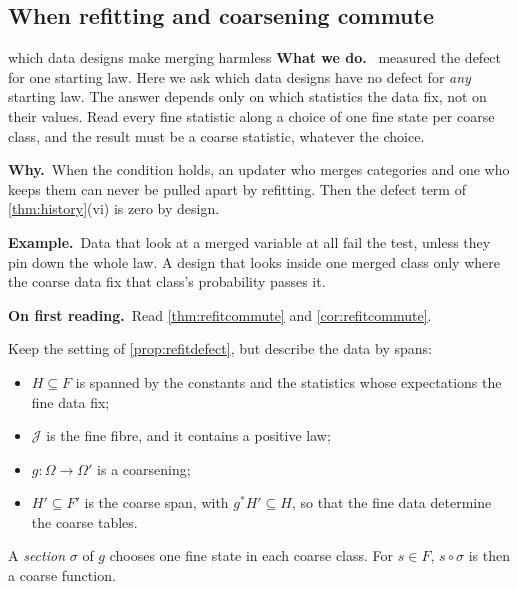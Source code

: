 \documentclass[11pt]{article}
\theoremstyle{definition}\newtheorem{definition}[theorem]{Definition}\newtheorem{remark}[theorem]{Remark}\newtheorem{example}[theorem]{Example}\newtheorem{problem}[theorem]{Open problem}\crefname{problem}{Problem}{Problems}
\newcommand{\rbwhat}{\textcolor{rbWhat}{\textbf{What we do.}}~}\newcommand{\rbwhy}{\par\smallskip\textcolor{rbWhy}{\textbf{Why.}}~}
\newcommand{\rbex}{\par\smallskip\textcolor{rbEx}{\textbf{Example.}}~}\newcommand{\rbbg}{\par\smallskip\textcolor{rbBg}{\textbf{Background.}}~}
\newcommand{\rbfirst}{\par\smallskip\textcolor{rbFirst}{\textbf{On first reading.}}~}
\begin{document}
\subsection{When refitting and coarsening commute}\label{sec:refitcommute}
\begin{readerbox}{which data designs make merging harmless}
\rbwhat {} measured the defect for one starting law. Here we ask which data designs have no defect for \emph{any} starting law. The answer depends only on which statistics the data fix, not on their values. Read every fine statistic along a choice of one fine state per coarse class, and the result must be a coarse statistic, whatever the choice.
\rbwhy When the condition holds, an updater who merges categories and one who keeps them can never be pulled apart by refitting. Then the defect term of \cref{thm:history}(vi) is zero by design.
\rbex Data that look at a merged variable at all fail the test, unless they pin down the whole law. A design that looks inside one merged class only where the coarse data fix that class's probability passes it.
\rbfirst Read \cref{thm:refitcommute} and \cref{cor:refitcommute}.
\end{readerbox}

Keep the setting of \cref{prop:refitdefect}, but describe the data by spans:
\begin{itemize}
\item $H\subseteq F$ is spanned by the constants and the statistics whose expectations the fine data fix;
\item $\mathcal J$ is the fine fibre, and it contains a positive law;
\item $g:\Omega\to\Omega'$ is a coarsening;
\item $H'\subseteq F'$ is the coarse span, with $g^*H'\subseteq H$, so that the fine data determine the coarse tables.
\end{itemize}
A \emph{section} $\sigma$ of $g$ chooses one fine state in each coarse class. For $s\in F$, $s\circ\sigma$ is then a coarse function.
\end{document}
